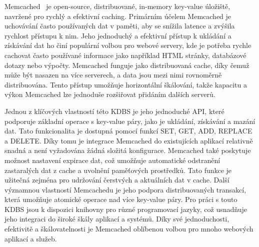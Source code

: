 \documentclass[czech,master,dept460,male,csharp,cpdeclaration]{diploma}
\begin{document}
	Memcached~\cite{memcached} je open-source, distribuované, in-memory key-value úložiště, navržené pro rychlý a efektivní caching. Primárním účelem Memcached je uchovávání často používaných dat v paměti, aby se snížila latence a zvýšila rychlost přístupu k nim. Jeho jednoduchý a efektivní přístup k ukládání a získávání dat ho činí populární volbou pro webové servery, kde je potřeba rychle cachovat často používané informace jako například HTML stránky, databázové dotazy nebo výpočty. Memcached funguje jako distribuovaná cache, díky čemuž může být nasazen na více serverech, a data jsou mezi nimi rovnoměrně distribuována. Tento přístup umožňuje horizontální škálování, takže kapacitu a výkon Memcached lze jednoduše rozšiřovat přidáním dalších serverů.
	
	Jednou z klíčových vlastností této KDBS je jeho jednoduché API, které podporuje základní operace s key-value páry, jako je ukládání, získávání a mazání dat. Tato funkcionalita je dostupná pomocí funkcí SET, GET, ADD, REPLACE a DELETE. Díky tomu je integrace Memcached do existujících aplikací relativně snadná a není vyžadována žádná složitá konfigurace. Memcached také poskytuje možnost nastavení expirace dat, což umožňuje automatické odstranění zastaralých dat z cache a uvolnění paměťových prostředků. Tato funkce je užitečná zejména pro udržování čerstvých a aktuálních dat v cache. Další významnou vlastností Memcachedu je jeho podpora distribuovaných transakcí, která umožňuje atomické operace nad více key-value páry. Pro práci s touto KDBS jsou k dispozici knihovny pro různé programovací jazyky, což usnadňuje jeho integraci do široké škály aplikací a systémů. Díky své jednoduchosti, efektivitě a škálovatelnosti je Memcached oblíbenou volbou pro mnoho webových aplikací a služeb.
\end{document}
